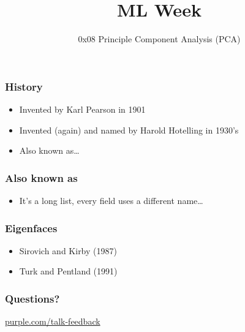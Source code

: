 
\title
{ML Week}
\subtitle{0x08 \hspace{2mm}  Principle Component Analysis (PCA)}




\begin{frame}
  \titlepage
\end{frame}


\begin{frame}
\end{frame}

\begin{frame}
  \frametitle{History}
  \begin{itemize}
  \item Invented by Karl Pearson in 1901
  \item Invented (again) and named by Harold Hotelling in 1930's
  \item Also known as\dots
  \end{itemize}
\end{frame}

\begin{frame}
  \frametitle{Also known as}

  \begin{itemize}
  \item It's a long list, every field uses a different name\dots
  \end{itemize}
\end{frame}

\begin{frame}
  \frametitle{Eigenfaces}
  \begin{itemize}
  \item Sirovich and Kirby (1987)
  \item Turk and Pentland (1991)
  \end{itemize}
  \vfill
\end{frame}


\begin{frame}
  \frametitle{Questions?}
  \centerline{\large\url{purple.com/talk-feedback}}
\end{frame}


